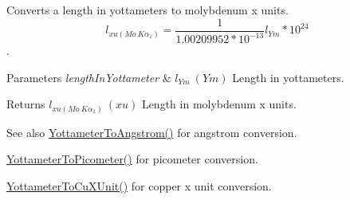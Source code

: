Converts a length in yottameters to molybdenum x units. \[ l_{xu(Mo\ K\alpha_1)}=\frac{1}{1.00209952*10^{-13}} l_{Ym} * 10^{24}\]. 


\begin{DoxyParams}{Parameters}
{\em length\+In\+Yottameter} & $ l_{Ym}\ (Ym)$ Length in yottameters. \\
\hline
\end{DoxyParams}
\begin{DoxyReturn}{Returns}
$ l_{xu(Mo\ K\alpha_1)}\ (xu)$ Length in molybdenum x units. 
\end{DoxyReturn}
\begin{DoxySeeAlso}{See also}
\mbox{\hyperlink{group___e_g_x_math-_conversions-_length_conversions-_yottameter-_non-_s_i_ga0129b788ceb2d7d4ce86c155ee9d4675}{Yottameter\+To\+Angstrom()}} for angstrom conversion. 

\mbox{\hyperlink{group___e_g_x_math-_conversions-_length_conversions-_yottameter-_s_i_ga7af9d1314de06921546f079641c033b2}{Yottameter\+To\+Picometer()}} for picometer conversion. 

\mbox{\hyperlink{group___e_g_x_math-_conversions-_length_conversions-_yottameter-_non-_s_i_ga5c8a9868ad238225dbf8ebdbfad13930}{Yottameter\+To\+Cu\+X\+Unit()}} for copper x unit conversion. 
\end{DoxySeeAlso}
